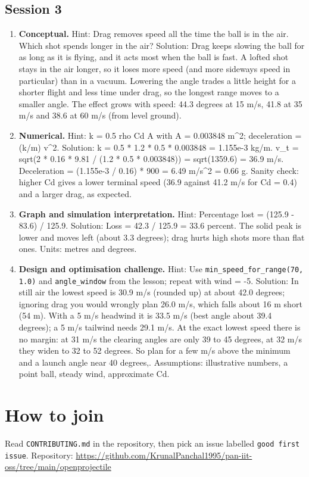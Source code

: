 \documentclass[11pt,a4paper]{article}
\begin{document}
\subsection*{Session 3}
\begin{enumerate}[nosep]
\item \textbf{Conceptual.} Hint: Drag removes speed all the time the ball is in the air. Which shot spends longer in the air? Solution: Drag keeps slowing the ball for as long as it is flying, and it acts most when the ball is fast. A lofted shot stays in the air longer, so it loses more speed (and more sideways speed in particular) than in a vacuum. Lowering the angle trades a little height for a shorter flight and less time under drag, so the longest range moves to a smaller angle. The effect grows with speed: 44.3 degrees at 15 m/s, 41.8 at 35 m/s and 38.6 at 60 m/s (from level ground).
\item \textbf{Numerical.} Hint: k = 0.5 rho Cd A with A = 0.003848 m\textasciicircum{}2; deceleration = (k/m) v\textasciicircum{}2. Solution: k = 0.5 * 1.2 * 0.5 * 0.003848 = 1.155e-3 kg/m. v\_t = sqrt(2 * 0.16 * 9.81 / (1.2 * 0.5 * 0.003848)) = sqrt(1359.6) = 36.9 m/s. Deceleration = (1.155e-3 / 0.16) * 900 = 6.49 m/s\textasciicircum{}2 = 0.66 g. Sanity check: higher Cd gives a lower terminal speed (36.9 against 41.2 m/s for Cd = 0.4) and a larger drag, as expected.
\item \textbf{Graph and simulation interpretation.} Hint: Percentage lost = (125.9 - 83.6) / 125.9. Solution: Loss = 42.3 / 125.9 = 33.6 percent. The solid peak is lower and moves left (about 3.3 degrees); drag hurts high shots more than flat ones. Units: metres and degrees.
\item \textbf{Design and optimisation challenge.} Hint: Use \texttt{min\_speed\_for\_range(70, 1.0)} and \texttt{angle\_window} from the lesson; repeat with wind = -5. Solution: In still air the lowest speed is 30.9 m/s (rounded up) at about 42.0 degrees; ignoring drag you would wrongly plan 26.0 m/s, which falls about 16 m short (54 m). With a 5 m/s headwind it is 33.5 m/s (best angle about 39.4 degrees); a 5 m/s tailwind needs 29.1 m/s. At the exact lowest speed there is no margin: at 31 m/s the clearing angles are only 39 to 45 degrees, at 32 m/s they widen to 32 to 52 degrees. So plan for a few m/s above the minimum and a launch angle near 40 degrees,. Assumptions: illustrative numbers, a point ball, steady wind, approximate Cd.
\end{enumerate}

\section{How to join}
Read \texttt{CONTRIBUTING.md} in the repository, then pick an issue labelled \texttt{good first issue}. Repository: \url{https://github.com/KrunalPanchal1995/pan-iit-oss/tree/main/openprojectile}
\end{document}
